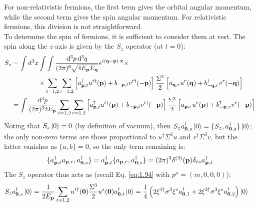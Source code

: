 For non-relativistic fermions, the first term gives the orbital angular momentum, while the second term gives the spin angular momentum. For relativistic fermions, this division is not straightforward.\\
To determine the spin of fermions, it is sufficient to consider them at rest. The spin along the $ z $-axis is given by the $ S_z $ operator (at $ t = 0 $):
\begin{equation*}
  \begin{split}
    S_z
    &= \int \mathrm{d}^3x \int \int \frac{\mathrm{d}^3p\, \mathrm{d}^3q}{(2\pi)^6 \sqrt{4 E_{\mathbf{p}} E_{\mathbf{q}}}} e^{i (\mathbf{q} - \mathbf{p}) \cdot \mathbf{x}} \times \\
    & \qquad \qquad \times \sum_{t = 1,2} \sum_{r = 1,2} \left[ a_{\mathbf{p},t}^\dagger u^{t\dagger}(\mathbf{p}) + b_{-\mathbf{p},t} v^{t\dagger}(-\mathbf{p}) \right] \frac{\Sigma^3}{2} \left[ a_{\mathbf{q},r} u^r(\mathbf{q}) + b_{-\mathbf{q},r}^\dagger v^r(-\mathbf{q}) \right] \\
    &= \int \frac{\mathrm{d}^3p}{(2\pi)^3 2E_{\mathbf{p}}} \sum_{t = 1,2} \sum_{r = 1,2} \left[ a_{\mathbf{p},t}^\dagger u^{t\dagger}(\mathbf{p}) + b_{-\mathbf{p},t} v^{t\dagger}(-\mathbf{p}) \right] \frac{\Sigma^3}{2} \left[ a_{\mathbf{p},r} u^r(\mathbf{p}) + b_{-\mathbf{p},r}^\dagger v^r(-\mathbf{p}) \right] \\
  \end{split}
\end{equation*}
Noting that $ S_z \ket{0} = 0 $ (by definition of vacuum), then $ S_z a_{\mathbf{0},s}^\dagger \ket{0} = \{S_z , a_{\mathbf{0},s}^\dagger\} \ket{0} $; the only non-zero terms are those proportional to $ u^\dagger \Sigma^3 u $ and $ v^\dagger \Sigma^3 v $, but the latter vanishes as $ \{a,b\} = 0 $, so the only term remaining is:
\begin{equation*}
  \{a_{\mathbf{p},t}^\dagger a_{\mathbf{p},r} , a_{\mathbf{0},s}^\dagger\} = a_{\mathbf{p},t}^\dagger \{a_{\mathbf{p},r} , a_{\mathbf{0},s}^\dagger\} = (2\pi)^3 \delta^{(3)}(\mathbf{p}) \delta_{rs} a_{\mathbf{p},t}^\dagger
\end{equation*}
The $ S_z $ operator thus acts as (recall Eq. \ref{eq:1.94} with $ p^\mu = (m,0,0,0) $):
\begin{equation*}
  \begin{split}
    S_z a_{\mathbf{0},s}^\dagger \ket{0}
    &= \frac{1}{2E_{\mathbf{p}}} \sum_{t = 1,2} u^{t\dagger}(\mathbf{0}) \frac{\Sigma^3}{2} u^s(\mathbf{0}) a_{\mathbf{0},t}^\dagger \ket{0} = \frac{1}{4} \left( 2\xi^{1\dagger} \sigma^3 \xi^s a_{\mathbf{0},1}^\dagger + 2\xi^{2\dagger} \sigma^3 \xi^s a_{\mathbf{0},2}^\dagger \right) \ket{0}
  \end{split}
\end{equation*}

